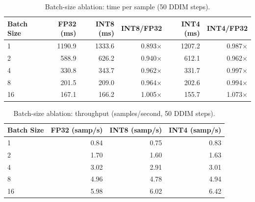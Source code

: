 \begin{table}
    [htbp]
    \centering
    \small
    \caption{Batch-size ablation: time per sample (50 DDIM steps).}
    \label{tab:batch_latency}
    \begin{tabular}{lrrrrr}
        \toprule Batch Size & FP32 (ms) & INT8 (ms) & INT8/FP32     & INT4 (ms) & INT4/FP32     \\
        \midrule 1          & 1190.9    & 1333.6    & 0.893$\times$ & 1207.2    & 0.987$\times$ \\
        2                   & 588.9     & 626.2     & 0.940$\times$ & 612.1     & 0.962$\times$ \\
        4                   & 330.8     & 343.7     & 0.962$\times$ & 331.7     & 0.997$\times$ \\
        8                   & 201.5     & 209.0     & 0.964$\times$ & 202.6     & 0.994$\times$ \\
        16                  & 167.1     & 166.2     & 1.005$\times$ & 155.7     & 1.073$\times$ \\
        \bottomrule
    \end{tabular}
\end{table}

\begin{table}
    [htbp]
    \centering
    \small
    \caption{Batch-size ablation: throughput (samples/second, 50 DDIM steps).}
    \label{tab:batch_throughput}
    \begin{tabular}{lrrr}
        \toprule Batch Size & FP32 (samp/s) & INT8 (samp/s) & INT4 (samp/s) \\
        \midrule 1          & 0.84          & 0.75          & 0.83          \\
        2                   & 1.70          & 1.60          & 1.63          \\
        4                   & 3.02          & 2.91          & 3.01          \\
        8                   & 4.96          & 4.78          & 4.94          \\
        16                  & 5.98          & 6.02          & 6.42          \\
        \bottomrule
    \end{tabular}
\end{table}